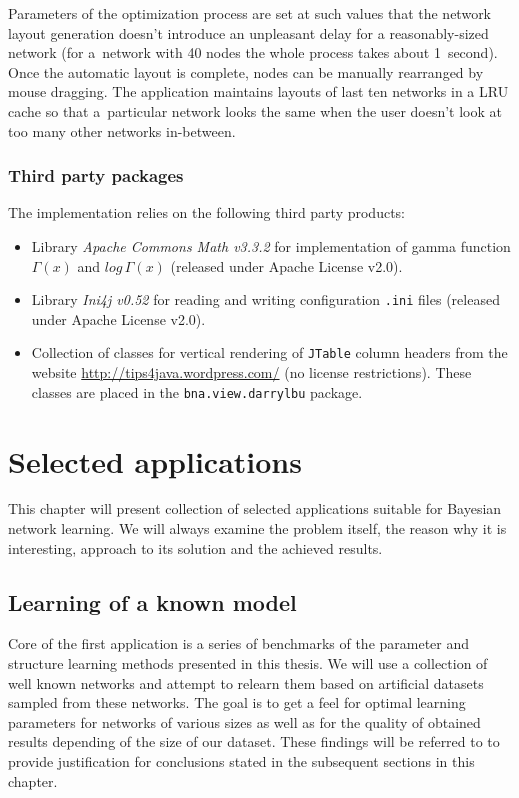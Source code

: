 \documentclass[english,cover]{fitthesis} %
\newcommand{\term}[1]{\emph{#1}}           %
\newcommand{\srccode}[1]{{\tt #1}}         %
\begin{document}
Parameters of the optimization process are set at such values that the network layout generation doesn't introduce an unpleasant delay for a reasonably-sized network (for a~network with 40 nodes the whole process takes about 1~second). Once the automatic layout is complete, nodes can be manually rearranged by mouse dragging. The application maintains layouts of last ten networks in a LRU cache so that a~particular network looks the same when the user doesn't look at too many other networks in-between.




\subsection{Third party packages}
The implementation relies on the following third party products:
\begin{itemize}
    \item Library \term{Apache Commons Math v3.3.2} for implementation of gamma function $\Gamma(x)$ and $log \, \Gamma(x)$ (released under Apache License v2.0).
	\item Library \term{Ini4j v0.52} for reading and writing configuration \srccode{.ini} files (released under Apache License v2.0).
	\item Collection of classes for vertical rendering of \srccode{JTable} column headers from the website \url{http://tips4java.wordpress.com/} (no license restrictions). These classes are placed in the \srccode{bna.view.darrylbu} package.
\end{itemize}





















\chapter{Selected applications}\label{ch:practical}
This chapter will present collection of selected applications suitable for Bayesian network learning. We will always examine the problem itself, the reason why it is interesting, approach to its solution and the achieved results.

\section{Learning of a known model}\label{ch:practical-learning-benchmarks}
Core of the first application is a series of benchmarks of the parameter and structure learning methods presented in this thesis. We will use a collection of well known networks and attempt to relearn them based on artificial datasets sampled from these networks. The goal is to get a feel for optimal learning parameters for networks of various sizes as well as for the quality of obtained results depending of the size of our dataset. These findings will be referred to to provide justification for conclusions stated in the subsequent sections in this chapter.
\end{document}
